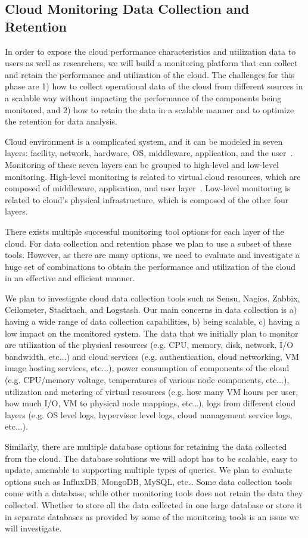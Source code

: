 \subsection{Cloud Monitoring Data Collection and Retention}


In order to expose the cloud performance characteristics and utilization data to users as well as researchers, we will build a monitoring platform that can collect and retain the performance and utilization of the cloud. The challenges for this phase are 1) how to collect operational data of the cloud from different sources in a scalable way without impacting the performance of the components being monitored, and 2) how to retain the data in a scalable manner and to optimize the retention for data analysis.

Cloud environment is a complicated system, and it can be modeled in seven layers: facility, network, hardware, OS, middleware, application, and the user~\cite{spring2011monitoring}. Monitoring of these seven layers can be grouped to high-level and low-level monitoring. 
High-level monitoring is related to virtual cloud resources, which are composed of middleware, application, and user layer~\cite{Aceto2013}. 
Low-level monitoring is related to cloud’s physical infrastructure, which is composed of the other four layers. 

There exists multiple successful monitoring tool options for each layer of the cloud. For data collection and retention phase we plan to use a subset of these tools. However, as there are many options, we need to evaluate and investigate a huge set of combinations to obtain the performance and utilization of the cloud in an effective and efficient manner. 

We plan to investigate cloud data collection tools such as Sensu, Nagios, Zabbix, Ceilometer, Stacktach, and Logstash. Our main concerns in data collection is a) having a wide range of data collection capabilities, b) being scalable, c) having a low impact on the monitored system.  The data that we initially plan to monitor are utilization of the physical resources (e.g. CPU, memory, disk, network, I/O bandwidth, etc...) and cloud services (e.g. authentication, cloud networking, VM image hosting services, etc...), power consumption of components of the cloud (e.g. CPU/memory voltage, temperatures of various node components, etc...), utilization and metering of virtual resources (e.g. how many VM hours per user, how much I/O, VM to physical node mappings, etc…), logs from different cloud layers (e.g. OS level logs, hypervisor level logs, cloud management service logs, etc...).   

Similarly, there are multiple database options for retaining the data collected from the cloud. The database solutions we will adopt has to be scalable, easy to update, amenable to supporting multiple types of queries. We plan to evaluate options such as InfluxDB, MongoDB, MySQL, etc… Some data collection tools come with a database, while other monitoring tools does not retain the data they collected. Whether to store all the data collected in one large database or store it in separate databases as provided by some of the monitoring tools is an issue we will investigate.

